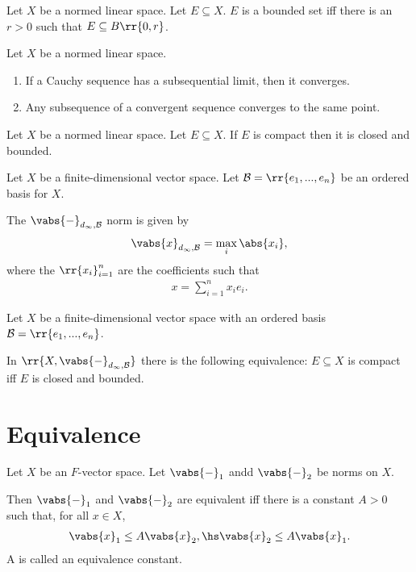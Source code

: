 \documentclass{article}
\begin{document}
\begin{definition}
  \label{def:bounded-set}
  Let $X$ be a normed linear space. Let $E\subseteq X$. $E$ is a bounded set iff there is an
  $r>0$ such that $E\subseteq B\rr{0,r}$.
\end{definition}

\begin{lemma}
  Let $X$ be a normed linear space.
  \begin{enumerate}
    \item If a Cauchy sequence has a subsequential limit, then it converges.
    \item Any subsequence of a convergent sequence converges to the same point.
  \end{enumerate}
\end{lemma}

\begin{theorem}
  Let $X$ be a normed linear space. Let $E\subseteq X$. If $E$ is compact then it is closed and bounded.
\end{theorem}

\begin{definition}
  Let $X$ be a finite-dimensional vector space. Let $\mathcal B=\rr{e_1,...,e_n}$ be
  an ordered basis for $X$.

  The $\vabs{-}_{d_\infty,\mathcal B}$ norm is given by
  \begin{align*}
    \vabs{x}_{d_\infty,\mathcal B}=\max_i \abs{x_i},
  \end{align*}
  where the $\rr{x_i}_{i=1}^n$ are the coefficients such that
  \begin{align*}
    x = \sum_{i=1}^{n} x_i e_i.
  \end{align*}
\end{definition}

\begin{lemma}
  Let $X$ be a finite-dimensional vector space with an ordered basis $\mathcal B = \rr{e_1, ..., e_n}$.

  In $\rr{X,\vabs{-}_{d_\infty,\mathcal B}}$ there is the following equivalence: $E\subseteq X$
  is compact iff $E$ is closed and bounded.
\end{lemma}

\section{Equivalence}
\label{sec:equivalence}

\begin{definition}
  \label{def:equivalence}
  Let $X$ be an $F$-vector space. Let $\vabs{-}_{1}$ andd $\vabs{-}_{2}$ be norms on $X$.

  Then $\vabs{-}_{1}$ and $\vabs{-}_{2}$ are equivalent iff there is a constant $A>0$ such
  that, for all $x\in X$,
  \begin{align*}
    \vabs{x}_{1}\leq A\vabs{x}_{2}, \hs
    \vabs{x}_{2}\leq A\vabs{x}_{1}.
  \end{align*}
  A is called an equivalence constant.
\end{definition}
\end{document}
